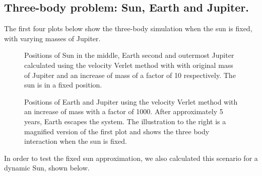 \documentclass[../main.tex]{subfiles}
\begin{document}
\subsection{Three-body problem: Sun, Earth and Jupiter.}
The first four plots below show the three-body simulation when the sun is fixed, with varying masses of Jupiter.

\begin{figure}[!h]
  \centering
  \caption{Positions of Sun in the middle, Earth second and outermost Jupiter calculated using the velocity Verlet method with with original mass of Jupiter and an increase of mass of a factor of 10 respectively. The sun is in a fixed position.}
  \label{fig:SunEarthJupiter10fixed}
\end{figure}

\begin{figure}[!h]
  \centering
  \caption{Positions of Earth and Jupiter using the velocity Verlet method with an increase of mass with a factor of 1000. After approximately 5 years, Earth escapes the system. The illustration to the right is a magnified version of the first plot and shows the three body interaction when the sun is fixed.}
  \label{fig:SunEarthJupiter10000fixed}
\end{figure}
\FloatBarrier

In order to test the fixed sun approximation, we also calculated this scenario for a dynamic Sun, shown below.
\end{document}

